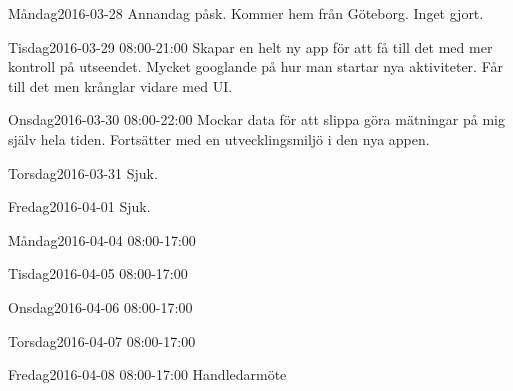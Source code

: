 \documentclass[a4paper,oneside]{book}
\begin{document}
\begin{diary}{Måndag}{2016-03-28}
	Annandag påsk. Kommer hem från Göteborg. Inget gjort.
\end{diary}

\begin{diary}{Tisdag}{2016-03-29 08:00-21:00}
	Skapar en helt ny app för att få till det med mer kontroll på utseendet. Mycket googlande på hur man startar nya aktiviteter. Får till det men krånglar vidare med UI.
\end{diary}

\begin{diary}{Onsdag}{2016-03-30 08:00-22:00}
	Mockar data för att slippa göra mätningar på mig själv hela tiden. Fortsätter med en utvecklingsmiljö i den nya appen.
\end{diary}

\begin{diary}{Torsdag}{2016-03-31}
	Sjuk.
\end{diary}

\begin{diary}{Fredag}{2016-04-01}
	Sjuk.
\end{diary}
\newpage

\begin{diary}{Måndag}{2016-04-04 08:00-17:00}
\end{diary}

\begin{diary}{Tisdag}{2016-04-05 08:00-17:00}

\end{diary}

\begin{diary}{Onsdag}{2016-04-06 08:00-17:00}

\end{diary}

\begin{diary}{Torsdag}{2016-04-07 08:00-17:00}

\end{diary}

\begin{diary}{Fredag}{2016-04-08 08:00-17:00}
	Handledarmöte
\end{diary}
\end{document}
